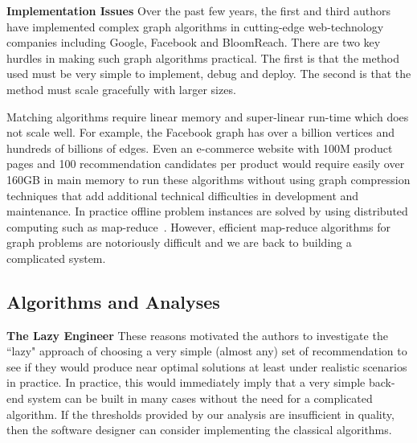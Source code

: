 {\bf Implementation Issues} Over the past few years, the first and
third authors have implemented complex graph algorithms in
cutting-edge web-technology companies including Google, Facebook and
BloomReach. There are two key hurdles in making such graph algorithms
practical. The first is that the method used must be very simple to
implement, debug and deploy. The second is that the method must scale
gracefully with larger sizes. \vs

Matching algorithms require linear memory and super-linear run-time
which does not scale well. For example, the Facebook graph has over a
billion vertices\cite{FacebookNodes} and hundreds of billions of edges. Even an
e-commerce website with 100M product pages and 100 recommendation candidates per
product would require easily over 160GB in main memory to run these
algorithms without using graph compression techniques that add additional technical difficulties
in development and maintenance. In practice offline problem instances are solved by using
distributed computing such as map-reduce~\cite{DeanGhemawat2004}. 
However, efficient map-reduce algorithms for graph problems
are notoriously difficult and we are back to building a complicated
system. \vs


\subsection{Algorithms and Analyses}

{\bf The Lazy Engineer} These reasons motivated the authors to
investigate the ``lazy" approach of choosing a very simple (almost
any) set of recommendation to see if they would produce near optimal
solutions at least under realistic scenarios in practice.  In
practice, this would immediately imply that a very simple back-end
system can be built in many cases without the need for a complicated
algorithm. If the thresholds provided by our analysis are insufficient
in quality, then the software designer can consider implementing the classical
algorithms. \vs

